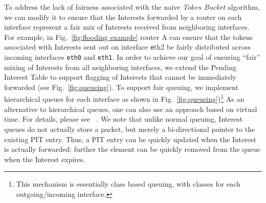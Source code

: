 

To address the lack of fairness associated with the naive {\it Token Bucket} algorithm, we can modify it to ensure that the Interests forwarded by a router on each interface represent a fair mix of Interests received from neighboring interfaces. For example, in Fig.~\ref{fig:flooding example} router A can ensure that the tokens associated with Interests sent out on interface {\texttt eth2}  be fairly distributed across incoming interfaces \texttt{eth0} and \texttt{eth1}. 
In order to achieve our goal of ensuring ``fair'' mixing of Interests from all neighboring interfaces, 
we extend the Pending Interest Table to support flagging of Interests that cannot be immediately forwarded (see Fig.~\ref{fig:queueing}). To support fair queuing, we implement hierarchical queues for each interface as shown in Fig.~\ref{fig:queueing})\footnote{This mechanism is essentially class based queuing, with classes for each outgoing/incoming interface.} As an alternative to hierarchical queues, one can also use an approach based on virtual time. For details, please see ~\cite{zhang1990virtual}.  We note that unlike normal queuing, Interest queues do not actually store a packet, but merely a bi-directional pointer to the existing PIT entry.
Thus, a PIT entry can be quickly updated when the Interest is actually forwarded; further the element can be quickly removed from the queue when the Interest expires.


